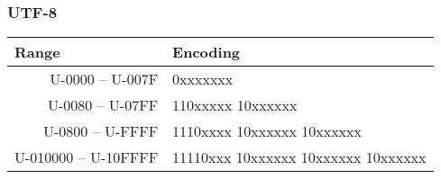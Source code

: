 \begin{frame}
\frametitle{UTF-8}
\color{structure}
\begin{center}
\begin{tabular}{rl}
\hline
\multicolumn{1}{l}{\textbf{Range}}& \textbf{Encoding} \\
\hline
U-0000 -- U-007F& 0xxxxxxx \\
U-0080 -- U-07FF& 110xxxxx 10xxxxxx \\
U-0800 -- U-FFFF& 1110xxxx 10xxxxxx 10xxxxxx \\
U-010000 -- U-10FFFF& 11110xxx 10xxxxxx 10xxxxxx 10xxxxxx \\
\hline
\end{tabular}
\end{center}
\end{frame}

